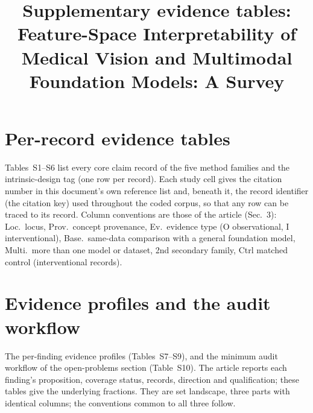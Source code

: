 \documentclass[final,3p,times,twocolumn,number,sort&compress]{elsarticle}
\begin{document}
\begin{frontmatter}
\title{Supplementary evidence tables: Feature-Space Interpretability of Medical Vision and Multimodal Foundation Models: A Survey}
\end{frontmatter}
\section*{Per-record evidence tables}
Tables~S1--S6 list every core claim record of the five method families and the intrinsic-design tag (one row per record). Each study cell gives the citation number in this document's own reference list and, beneath it, the record identifier (the citation key) used throughout the coded corpus, so that any row can be traced to its record. Column conventions are those of the article (Sec.~3): Loc.\ locus, Prov.\ concept provenance, Ev.\ evidence type (O observational, I interventional), Base.\ same-data comparison with a general foundation model, Multi.\ more than one model or dataset, 2nd secondary family, Ctrl matched control (interventional records).
\renewcommand{\thetable}{S1}
\renewcommand{\thetable}{S2}
\renewcommand{\thetable}{S3}
\renewcommand{\thetable}{S4}
\renewcommand{\thetable}{S5}
\renewcommand{\thetable}{S6}
\FloatBarrier

\section*{Evidence profiles and the audit workflow}
The per-finding evidence profiles (Tables~S7--S9), and the minimum
audit workflow of the open-problems section (Table~S10). The article reports each finding's proposition,
coverage status, records, direction and qualification; these tables give the underlying fractions. They are
set landscape, three parts with identical columns; the conventions common to all three follow.



\renewcommand{\thetable}{S7}
\renewcommand{\thetable}{S8}
\renewcommand{\thetable}{S9}
\renewcommand{\thetable}{S10}
\FloatBarrier
\end{document}
